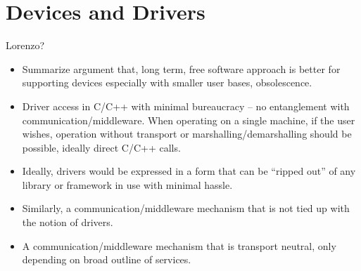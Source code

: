 

\section{Devices and Drivers}

Lorenzo?


\begin{itemize}


\item Summarize argument that, long term, free software approach 
is better for supporting devices especially with smaller user
bases, obsolescence.


\item Driver access in C/C++ with minimal bureaucracy -- no
entanglement with communication/middleware.  When operating
on a single machine, if the user wishes, operation without
transport or marshalling/demarshalling should be possible, ideally
direct C/C++ calls.

\item Ideally, drivers would be expressed in a form that
can be ``ripped out'' of any library or framework in use
with minimal hassle.

\item Similarly, a communication/middleware mechanism that is 
not tied up with the notion of drivers.

\item A communication/middleware mechanism that is transport
neutral, only depending on broad outline of services.


\end{itemize}




